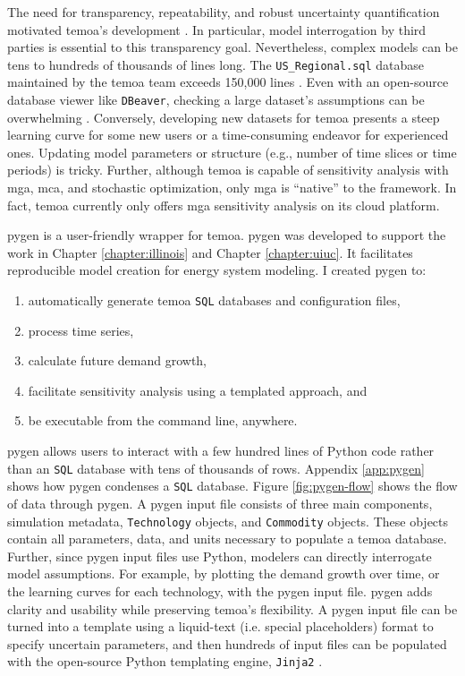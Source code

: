 The need for transparency, repeatability, and robust uncertainty quantification
motivated \gls{temoa}'s development \cite{hunter_modeling_2013}.
In particular, model interrogation by third parties is essential to this transparency
goal. Nevertheless, complex models can be tens to hundreds of thousands of lines long.
The \texttt{US\_Regional.sql} database maintained by the \gls{temoa} team exceeds
150,000 lines \cite{model_databases_2021}. Even with an open-source
database viewer like \texttt{DBeaver}, checking a large dataset's assumptions can be
overwhelming \cite{noauthor_dbeaver_nodate}. Conversely, developing new datasets
for \gls{temoa} presents a steep learning curve for some new users or a time-consuming
endeavor for experienced ones. Updating model parameters or structure (e.g., number
of time slices or time periods) is tricky. Further, although \gls{temoa}
is capable of sensitivity analysis with \gls{mga}, \gls{mca}, and stochastic
optimization, only \gls{mga} is ``native'' to the framework. In fact, \gls{temoa}
currently only offers \gls{mga} sensitivity analysis on its cloud platform.

\gls{pygen} is a user-friendly wrapper for \gls{temoa}. \gls{pygen} was developed
to support the work in Chapter \ref{chapter:illinois} and Chapter \ref{chapter:uiuc}.
It facilitates reproducible model creation for energy system modeling.
I created \gls{pygen} to:
\begin{enumerate}
  \item automatically generate \gls{temoa} \texttt{SQL} databases and configuration files,
  \item process time series,
  \item calculate future demand growth,
  \item facilitate sensitivity analysis using a templated approach, and
  \item be executable from the command line, anywhere.
\end{enumerate}
\gls{pygen} allows users to interact with a few hundred lines of Python code rather
than an \texttt{SQL} database with tens of thousands of rows. Appendix \ref{app:pygen}
shows how \gls{pygen} condenses a \texttt{SQL} database.
Figure \ref{fig:pygen-flow} shows the flow of data through \gls{pygen}.
A \gls{pygen} input file consists of three main components, simulation metadata,
\texttt{Technology} objects, and \texttt{Commodity} objects. These objects
contain all parameters, data, and units necessary to populate a \gls{temoa}
database. Further, since \gls{pygen} input files use Python, modelers
can directly interrogate model assumptions. For example, by plotting the demand
growth over time, or the learning curves for each technology, with the \gls{pygen}
input file.
\gls{pygen} adds clarity and usability while preserving \gls{temoa}'s flexibility.
A \gls{pygen} input file can be turned into a template using a liquid-text (i.e.
special placeholders) format to specify uncertain parameters, and then hundreds
of input files can be populated with the open-source Python templating engine,
\texttt{Jinja2} \cite{noauthor_jinja_2022}.

